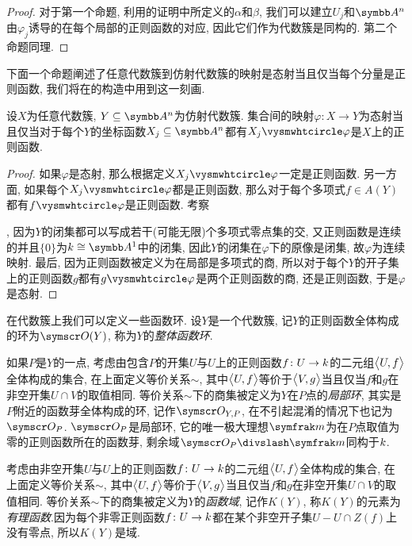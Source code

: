 \begin{proof}
  对于第一个命题, 利用的证明中所定义的$\alpha$和$\beta$, 我们可以建立$U_j$和$\AF^n$由$\varphi_j$诱导的在每个局部的正则函数的对应, 因此它们作为代数簇是同构的. 第二个命题同理.
\end{proof}

下面一个命题阐述了任意代数簇到仿射代数簇的映射是态射当且仅当每个分量是正则函数, 我们将在的构造中用到这一刻画.

\begin{proposition}\label{prop:morphismtoaffinevariety}
  设$X$为任意代数簇, $Y\subseteq \AF^n$为仿射代数簇. 集合间的映射$\varphi\colon X\to Y$为态射当且仅当对于每个$Y$的坐标函数$X_j\subseteq \AF^n$都有$X_j\composite\varphi$是$X$上的正则函数.
\end{proposition}

\begin{proof}
  如果$\varphi$是态射, 那么根据定义$X_j\composite\varphi$一定是正则函数. 另一方面, 如果每个$X_j\composite\varphi$都是正则函数, 那么对于每个多项式$f\in A(Y)$都有$f\composite \varphi$是正则函数. 考察
  , 因为$Y$的闭集都可以写成若干(可能无限)个多项式零点集的交, 又正则函数是连续的并且$\{0\}$为$\kk\cong \AF^1$中的闭集, 因此$Y$的闭集在$\varphi$下的原像是闭集, 故$\varphi$为连续映射. 最后, 因为正则函数被定义为在局部是多项式的商, 所以对于每个$Y$的开子集上的正则函数$g$都有$g\composite\varphi$是两个正则函数的商, 还是正则函数, 于是$\varphi$是态射.
\end{proof}

在代数簇上我们可以定义一些函数环. 设$Y$是一个代数簇, 记$Y$的正则函数全体构成的环为$\OO (Y)$, 称为$Y$的\emph{整体函数环}.

如果$P$是$Y$的一点, 考虑由包含$P$的开集$U$与$U$上的正则函数$f\colon U\to \kk$的二元组$\lrbig<>{U, f}$全体构成的集合, 在上面定义等价关系$\sim$, 其中$\lrbig<>{U, f}$等价于$\lrbig<>{V, g}$当且仅当$f$和$g$在非空开集$U\cap V$的取值相同. 等价关系$\sim$下的商集被定义为$Y$在$P$点的\emph{局部环}, 其实是$P$附近的函数芽全体构成的环, 记作$\OO_{Y, P}$, 在不引起混淆的情况下也记为$\OO_P$. $\OO_P$是局部环, 它的唯一极大理想$\ideal{m}$为在$P$点取值为零的正则函数所在的函数芽, 剩余域$\OO_P{\divslash}\ideal{m}$同构于$\kk$.%

考虑由非空开集$U$与$U$上的正则函数$f\colon U\to \kk$的二元组$\lrbig<>{U, f}$全体构成的集合, 在上面定义等价关系$\sim$, 其中$\lrbig<>{U, f}$等价于$\lrbig<>{V, g}$当且仅当$f$和$g$在非空开集$U\cap V$的取值相同. 等价关系$\sim$下的商集被定义为$Y$的\emph{函数域}, 记作$K(Y)$, 称$K(Y)$的元素为\emph{有理函数}.因为每个非零正则函数$f\colon U\to \kk$都在某个非空开子集$U-U\cap Z(f)$上没有零点, 所以$K(Y)$是域.

